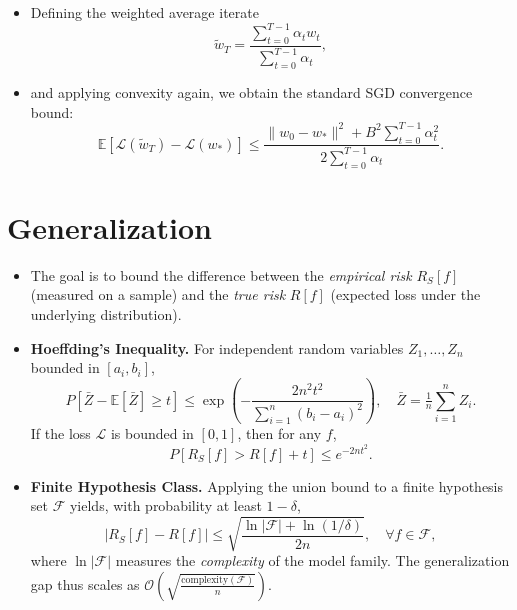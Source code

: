 \documentclass[a4paper]{article}
\begin{document}
\begin{itemize}
\begin{itemize}
\begin{itemize}
                    \item Defining the weighted average iterate
                        $$\tilde{w}_T = \frac{\sum_{t=0}^{T-1}\alpha_t w_t}{\sum_{t=0}^{T-1}\alpha_t},$$
                    \item and applying convexity again, we obtain the standard SGD convergence bound:
                        $$ \mathbb{E}[\mathcal{L}(\tilde{w}_T) - \mathcal{L}(w_*)] \le
                \frac{\|w_0 - w_*\|^2 + B^2 \sum_{t=0}^{T-1}\alpha_t^2} {2 \sum_{t=0}^{T-1}\alpha_t}.$$
                \end{itemize}

        \end{itemize}
\end{itemize}

\section{Generalization}
\begin{itemize}
    \item The goal is to bound the difference between the \emph{empirical risk} $R_S[f]$ (measured on a sample) and the \emph{true risk} $R[f]$ (expected loss under the underlying distribution).

    \item \textbf{Hoeffding’s Inequality.}
    For independent random variables $Z_1, \dots, Z_n$ bounded in $[a_i, b_i]$,
    \[
    P[\bar{Z} - \mathbb{E}[\bar{Z}] \ge t]
    \le 
    \exp\!\left(-\frac{2n^2 t^2}{\sum_{i=1}^n (b_i - a_i)^2}\right),
    \quad
    \bar{Z} = \tfrac{1}{n}\sum_{i=1}^n Z_i.
    \]
    If the loss $\mathcal{L}$ is bounded in $[0,1]$, then for any $f$,
    \[
    P[R_S[f] > R[f] + t] \le e^{-2nt^2}.
    \]

    \item \textbf{Finite Hypothesis Class.}
    Applying the union bound to a finite hypothesis set $\mathcal{F}$ yields, with probability at least $1 - \delta$,
    \[
    |R_S[f] - R[f]|
    \le
    \sqrt{\frac{\ln|\mathcal{F}| + \ln(1/\delta)}{2n}},
    \quad
    \forall f \in \mathcal{F},
    \]
    where $\ln|\mathcal{F}|$ measures the \emph{complexity} of the model family. 
    The generalization gap thus scales as
    $\mathcal{O}\!\left(\sqrt{\tfrac{\text{complexity}(\mathcal{F})}{n}}\right)$.
\end{itemize}
\end{document}
